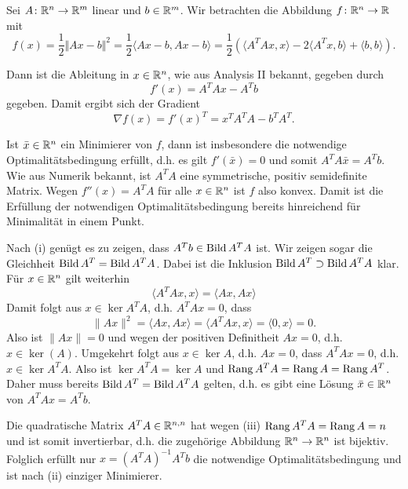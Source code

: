 Sei $A\colon \mathbb{R}^n\to\mathbb{R}^m$ linear und $b\in\mathbb{R}^m$. Wir betrachten die Abbildung $f\colon \mathbb{R}^n\to\mathbb{R}$ mit
\begin{displaymath}
 f(x)=\frac{1}{2}\Vert Ax-b\Vert^2=\frac{1}{2}\langle Ax-b,Ax-b\rangle=\frac{1}{2}(\langle A^TAx,x\rangle-2\langle A^Tx,b\rangle+\langle b,b\rangle).
\end{displaymath}
\begin{compactenum}[(i)]
 \item Dann ist die Ableitung in $x\in\mathbb{R}^n$, wie aus Analysis II bekannt, gegeben durch
 \begin{displaymath}
 f'(x)=  A^TAx- A^Tb
 \end{displaymath}
 gegeben. Damit ergibt sich der Gradient
 \begin{displaymath}
  \nabla f(x) = f'(x)^T= x^TA^TA-b^TA^T.
 \end{displaymath}
 \item Ist $\bar x\in\mathbb{R}^n$ ein Minimierer von $f$, dann ist insbesondere die notwendige Optimalitätsbedingung erfüllt, d.h. es gilt $f'(\bar x)=0$
 und somit $A^TA\bar x=A^Tb$. Wie aus Numerik bekannt, ist $A^TA$ eine symmetrische, positiv semidefinite Matrix. Wegen $f''(x)=A^TA$ für alle $x\in\mathbb{R}^n$ ist $f$ also konvex.
 Damit ist die Erfüllung der notwendigen Optimalitätsbedingung bereits hinreichend für Minimalität in einem Punkt.\\
 \item Nach (i) genügt es zu zeigen, dass $A^Tb\in\operatorname{Bild} A^TA$ ist. Wir zeigen sogar die Gleichheit $\operatorname{Bild} A^T = \operatorname{Bild} A^TA$. Dabei ist die Inklusion $\operatorname{Bild} A^T \supset \operatorname{Bild} A^TA$ klar. Für $x\in\mathbb{R}^n$
 gilt weiterhin
 \begin{displaymath}
  \langle A^TAx,x\rangle=\langle Ax, Ax\rangle
 \end{displaymath}
Damit folgt aus $x\in\ker A^TA$, d.h. $A^TAx=0$, dass
$$\|Ax\|^2=\langle Ax,Ax \rangle=\langle A^TAx,x \rangle=\langle 0,x \rangle=0.$$
Also ist $\|Ax\|=0$ und wegen der positiven Definitheit $Ax=0$, d.h. $x\in \ker(A)$. Umgekehrt folgt aus $x\in\ker A$, d.h. $Ax=0$, dass $A^TAx=0$, d.h. $x\in\ker A^TA$. Also ist $\ker A^TA=\ker A$ und $  \operatorname{Rang} A^T A=\operatorname{Rang} A=\operatorname{Rang} A^T$.  Daher muss bereits $\operatorname{Bild} A^T = \operatorname{Bild} A^TA$ gelten, d.h. es gibt eine Lösung $\bar x\in\mathbb{R}^n$ von $A^TAx=A^Tb$.\\
 \item Die quadratische Matrix $A^TA\in \mathbb{R}^{n,n}$ hat wegen (iii) $\operatorname{Rang} A^TA=\operatorname{Rang} A=n$ und ist somit invertierbar, d.h. die zugehörige Abbildung $\mathbb{R}^n\to\mathbb{R}^n$ ist bijektiv. Folglich erfüllt nur $x=(A^TA)^{-1}A^Tb$ die notwendige Optimalitätsbedingung und ist nach (ii) einziger Minimierer.
\end{compactenum}

